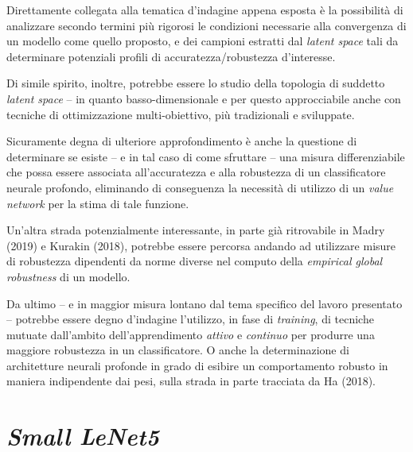 \documentclass[a4paper, twoside]{article}
\begin{document}
Direttamente collegata alla tematica d'indagine appena esposta è la possibilità di analizzare secondo termini più rigorosi le condizioni necessarie alla convergenza di un modello come quello proposto, e dei campioni estratti dal \textit{latent space} tali da determinare potenziali profili di accuratezza/robustezza d'interesse.

Di simile spirito, inoltre, potrebbe essere lo studio della topologia di suddetto \textit{latent space} -- in quanto basso-dimensionale e per questo approcciabile anche con tecniche di ottimizzazione multi-obiettivo, più tradizionali e sviluppate.

Sicuramente degna di ulteriore approfondimento è anche la questione di determinare se esiste -- e in tal caso di come sfruttare -- una misura differenziabile che possa essere associata all'accuratezza e alla robustezza di un classificatore neurale profondo, eliminando di conseguenza la necessità di utilizzo di un \textit{value network} per la stima di tale funzione.

Un'altra strada potenzialmente interessante, in parte già ritrovabile in Madry (2019) e Kurakin (2018), potrebbe essere percorsa andando ad utilizzare misure di robustezza dipendenti da norme diverse nel computo della \textit{empirical global robustness} di un modello.

Da ultimo -- e in maggior misura lontano dal tema specifico del lavoro presentato -- potrebbe essere degno d'indagine l'utilizzo, in fase di \textit{training}, di tecniche mutuate dall'ambito dell'apprendimento \textit{attivo} e \textit{continuo} per produrre una maggiore robustezza in un classificatore. O anche la determinazione di architetture neurali profonde in grado di esibire un comportamento robusto in maniera indipendente dai pesi, sulla strada in parte tracciata da Ha (2018).


\newpage
\nocite{*}



\newpage
\appendix

\section{\textit{Small LeNet5}}
\end{document}
